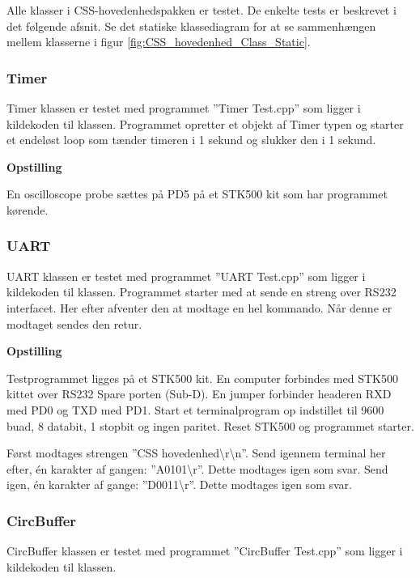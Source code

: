 Alle klasser i CSS-hovedenhedspakken er testet. De enkelte tests er beskrevet i det følgende afsnit.
Se det statiske klassediagram for at se sammenhængen mellem klasserne i figur \ref{fig:CSS_hovedenhed_Class_Static}.

\subsubsection{Timer}
Timer klassen er testet med programmet ''Timer Test.cpp'' som ligger i kildekoden til klassen.
Programmet opretter et objekt af Timer typen og starter et endeløst loop som tænder timeren i 1 sekund og slukker den i 1 sekund.

\textbf{Opstilling}

En oscilloscope probe sættes på PD5 på et STK500 kit som har programmet kørende.




\subsubsection{UART}
UART klassen er testet med programmet ''UART Test.cpp'' som ligger i kildekoden til klassen.
Programmet starter med at sende en streng over RS232 interfacet. Her efter afventer den at modtage en hel kommando. Når denne er modtaget sendes den retur.

\textbf{Opstilling}

Testprogrammet ligges på et STK500 kit.
En computer forbindes med STK500 kittet over RS232 Spare porten (Sub-D).
En jumper forbinder headeren RXD med PD0 og TXD med PD1.
Start et terminalprogram op indstillet til 9600 buad, 8 databit, 1 stopbit og ingen paritet.
Reset STK500 og programmet starter.

Først modtages strengen ''CSS hovedenhed\textbackslash r\textbackslash n''.
Send igennem terminal her efter, én karakter af gangen: ''A0101\textbackslash r''. Dette modtages igen som svar.
Send igen, én karakter af gange: ''D0011\textbackslash r''. Dette modtages igen som svar.

\subsubsection{CircBuffer}
CircBuffer klassen er testet med programmet ''CircBuffer Test.cpp'' som ligger i kildekoden til klassen.

